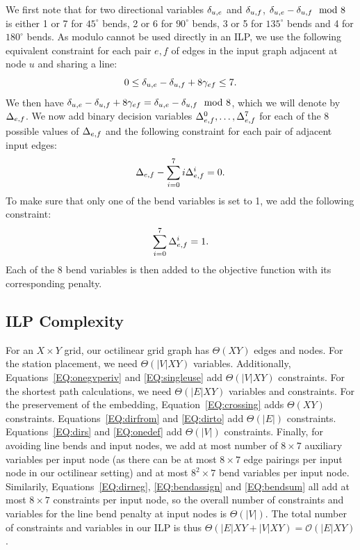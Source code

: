 \documentclass[sigconf]{acmart}
\begin{document}
We first note that for two directional variables $\delta_{u,e}$ and $\delta_{u,f}$, $\delta_{u,e} - \delta_{u,f} \mod 8$ is either 1 or 7 for $45^\circ$ bends, 2 or 6 for $90^\circ$ bends, 3 or 5 for $135^\circ$ bends and 4 for $180^\circ$ bends.
As modulo cannot be used directly in an ILP, we use the following equivalent constraint for each pair $e, f$ of edges in the input graph adjacent at node $u$ and sharing a line:
%
\begin{equation} 
  0 \leq \delta_{u,e} - \delta_{u,f} + 8 \gamma_{ef} \leq 7 \label{EQ:dirneg}.
\end{equation}
%
We then have $\delta_{u,e} - \delta_{u,f} + 8 \gamma_{ef} = \delta_{u,e} - \delta_{u,f} \mod 8$, which we will denote by $\Delta_{e,f}$.
We now add binary decision variables $\Delta_{e,f}^{0}, \dots, \Delta_{e,f}^{7}$ for each of the 8 possible values of $\Delta_{e,f}$ and the following constraint for each pair of adjacent input edges:
%
\begin{equation} 
  \Delta_{e,f} - \sum_{i = 0}^7 i\Delta_{e,f}^{i} = 0 \label{EQ:bendassign}.
\end{equation}
%
To make sure that only one of the bend variables is set to 1, we add the following constraint:
%
\begin{equation} 
  \sum_{i = 0}^7 \Delta_{e,f}^{i} = 1 \label{EQ:bendsum}.
\end{equation}
%
Each of the 8 bend variables is then added to the objective function with its corresponding penalty.

\subsection{ILP Complexity}

For an $X \times Y$ grid, our octilinear grid graph has $\Theta(XY)$ edges and nodes.
For the station placement, we need ${\Theta}(|V|XY)$ variables.
Additionally, Equations~\ref{EQ:onegvperiv} and \ref{EQ:singleuse} add ${\Theta}(|V|XY)$ constraints.
For the shortest path calculations, we need ${\Theta}(|E|XY)$ variables and constraints.
For the preservement of the embedding, Equation~\ref{EQ:crossing} adds ${\Theta}(XY)$ constraints.
Equations~\ref{EQ:dirfrom} and \ref{EQ:dirto} add ${\Theta}(|E|)$ constraints.
Equations~\ref{EQ:dirs} and \ref{EQ:onedef} add ${\Theta}(|V|)$ constraints.
Finally, for avoiding line bends and input nodes, we add at most number of $8\times7$ auxiliary variables per input node (as there can be at most $8\times7$ edge pairings per input node in our octilinear setting) and at most $8^2\times7$ bend variables per input node.
Similarily, Equations~\ref{EQ:dirneg}, \ref{EQ:bendassign} and \ref{EQ:bendsum} all add at most $8\times7$ constraints per input node, so the overall number of constraints and variables for the line bend penalty at input nodes is ${\Theta}(|V|)$.
The total number of constraints and variables in our ILP is thus ${\Theta}(|E|XY + |V|XY) = \mathcal{O}(|E|XY)$.
\end{document}
